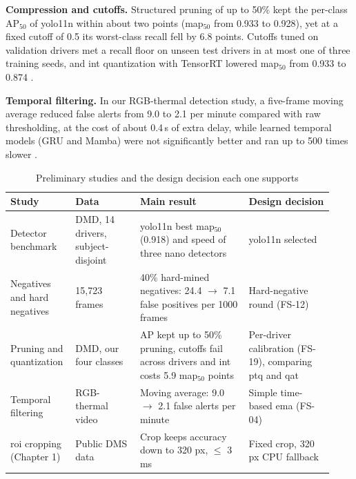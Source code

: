 \textbf{Compression and cutoffs.} Structured pruning of up to 50\% kept the per-class AP$_{50}$ of \gls{yolo}11n within about two points (\gls{map}$_{50}$ from 0.933 to 0.928), yet at a fixed cutoff of 0.5 its worst-class recall fell by 6.8 points. Cutoffs tuned on validation drivers met a recall floor on unseen test drivers in at most one of three training seeds, and \gls{int} quantization with TensorRT lowered \gls{map}$_{50}$ from 0.933 to 0.874 \cite{rs3}.

\textbf{Temporal filtering.} In our RGB-thermal detection study, a five-frame moving average reduced false alerts from 9.0 to 2.1 per minute compared with raw thresholding, at the cost of about 0.4\,s of extra delay, while learned temporal models (GRU and Mamba) were not significantly better and ran up to 500 times slower \cite{rs4}.


\begin{table}[htbp]
\centering
\caption{Preliminary studies and the design decision each one supports}
\label{tab:prelim}
\footnotesize
\setlength{\tabcolsep}{3pt}
\renewcommand{\arraystretch}{1.15}
\begin{tabular}{|p{0.170\linewidth}|p{0.190\linewidth}|p{0.320\linewidth}|p{0.250\linewidth}|}
\hline
\textbf{Study} & \textbf{Data} & \textbf{Main result} & \textbf{Design decision} \\
\hline
Detector benchmark \cite{rs1} & DMD, 14 drivers, subject-disjoint & \gls{yolo}11n best \gls{map}$_{50}$ (0.918) and speed of three nano detectors & \gls{yolo}11n selected \\
\hline
Negatives and hard negatives \cite{rs2} & 15{,}723 frames & 40\% hard-mined negatives: 24.4 $\rightarrow$ 7.1 false positives per 1000 frames & Hard-negative round (FS-12) \\
\hline
Pruning and quantization \cite{rs3} & DMD, our four classes & AP kept up to 50\% pruning, cutoffs fail across drivers and \gls{int} costs 5.9 \gls{map}$_{50}$ points & Per-driver calibration (FS-19), comparing \gls{ptq} and \gls{qat} \\
\hline
Temporal filtering \cite{rs4} & RGB-thermal video & Moving average: 9.0 $\rightarrow$ 2.1 false alerts per minute & Simple time-based \gls{ema} (FS-04) \\
\hline
\gls{roi} cropping (Chapter 1) & Public DMS data & Crop keeps accuracy down to 320 px, $\le$ 3 ms & Fixed crop, 320 px CPU fallback \\
\hline
\end{tabular}
\end{table}

